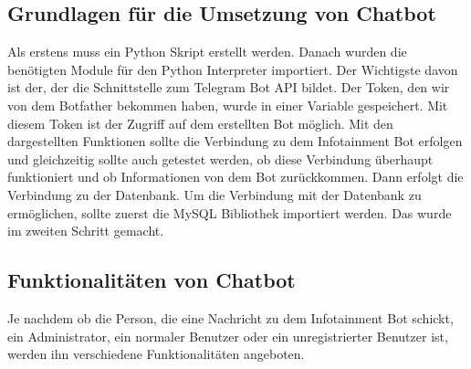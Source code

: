 \subsection{Grundlagen für die Umsetzung von Chatbot}

Als erstens muss ein Python Skript erstellt werden. Danach wurden die benötigten Module für den Python Interpreter importiert.  Der Wichtigste davon ist der, der die Schnittstelle zum Telegram Bot API bildet.
Der Token, den wir von dem Botfather bekommen haben, wurde in einer Variable gespeichert. Mit diesem Token ist der Zugriff auf dem erstellten Bot möglich. Mit den dargestellten Funktionen sollte die Verbindung zu dem Infotainment Bot erfolgen und gleichzeitig sollte auch getestet werden, ob diese Verbindung überhaupt funktioniert und ob Informationen von dem Bot zurückkommen. Dann erfolgt die Verbindung zu der Datenbank. Um die Verbindung mit der Datenbank zu ermöglichen, sollte zuerst die MySQL Bibliothek importiert werden. Das wurde im zweiten Schritt gemacht. 

\subsection{Funktionalitäten von Chatbot}
Je nachdem ob die Person, die eine Nachricht zu dem Infotainment Bot schickt, ein Administrator, ein normaler Benutzer oder ein unregistrierter Benutzer ist, werden ihn verschiedene Funktionalitäten angeboten. 
